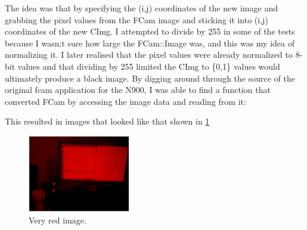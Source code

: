 The idea was that by specifying the (i,j) coordinates of the new image and grabbing the pixel values from the FCam image and sticking it into (i,j) coordinates of the new CImg. I attempted to divide by 255 in some of the tests because I wasn;t sure how large the FCam::Image was, and this was my idea of normalizing it. I later realised that the pixel values were already normalized to 8-bit values and that dividing by 255 limited the CImg to \{0,1\} values would ultimately produce a black image.
By digging around through the source of the original fcam application for the N900, I was able to find a function that converted FCam by accessing the image data and reading from it:
\begin{frame}{}

\end{frame}
This resulted in images that looked like that shown in \cref{img:red}
\begin{figure}
        	\vspace{0pt}\hspace{-200pt}
	\centering
		\includegraphics[width=0.4\textwidth]{../images/redbuffer1}\hspace{-200pt}
	\caption{Very red image.}\hspace{-200pt}
	\label{img:red}\hspace{-200pt}
\end{figure}

